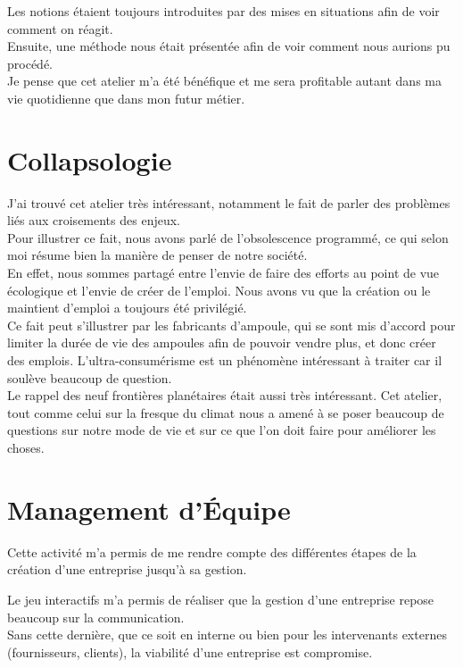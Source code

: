 Les notions étaient toujours introduites par des mises en situations afin de voir comment on réagit.\\ Ensuite, une méthode nous était présentée afin de voir comment nous aurions pu procédé.\\
Je pense que cet atelier m'a été bénéfique et me sera profitable autant dans ma vie quotidienne que dans mon futur métier.


\section{Collapsologie}

J'ai trouvé cet atelier très intéressant, notamment le fait de parler des problèmes liés aux croisements des enjeux.\\
Pour illustrer ce fait, nous avons parlé de l'obsolescence programmé, ce qui selon moi résume bien la manière de penser de notre société.\\
En effet, nous sommes partagé entre l'envie de faire des efforts au point de vue écologique et l'envie de créer de l'emploi. Nous avons vu que la création ou le maintient d'emploi a toujours été privilégié.\\
Ce fait peut s'illustrer par les fabricants d'ampoule, qui se sont mis d'accord pour limiter la durée de vie des ampoules afin de pouvoir vendre plus, et donc créer des emplois. L'ultra-consumérisme est un phénomène intéressant à traiter car il soulève beaucoup de question.\\

Le rappel des neuf frontières planétaires était aussi très intéressant. Cet atelier, tout comme celui sur la fresque du climat nous a amené à se poser beaucoup de questions sur notre mode de vie et sur ce que l'on doit faire pour améliorer les choses.



\section{Management d'Équipe}

Cette activité m'a permis de me rendre compte des différentes étapes de la création d'une entreprise jusqu'à sa gestion.

Le jeu interactifs m'a permis de réaliser que la gestion d'une entreprise repose beaucoup sur la communication. \\
Sans cette dernière, que ce soit en interne ou bien pour les intervenants externes (fournisseurs, clients), la viabilité d'une entreprise est compromise.\\

